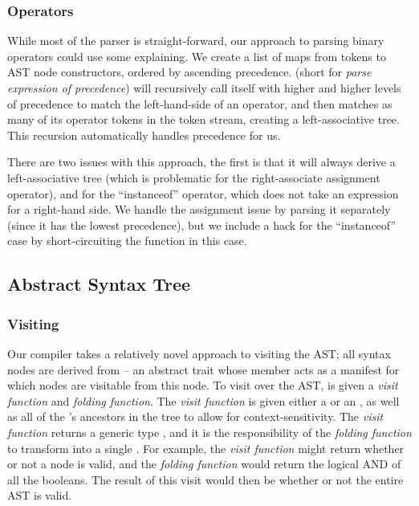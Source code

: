 \documentclass{article}
\begin{document}
\subsubsection{Operators}

While most of the parser is straight-forward, our approach to parsing binary operators could use some explaining. We
create a list of maps from tokens to AST node constructors, ordered by ascending precedence.  (short
for \emph{parse expression of precedence}) will recursively call itself with higher and higher levels of precedence to
match the left-hand-side of an operator, and then matches as many of its operator tokens in the token stream, creating a
left-associative tree. This recursion automatically handles precedence for us.

There are two issues with this approach, the first is that it will always derive a left-associative tree (which is
problematic for the right-associate assignment operator), and for the ``instanceof'' operator, which does not take an
expression for a right-hand side. We handle the assignment issue by parsing it separately (since it has the lowest
precedence), but we include a hack for the ``instanceof'' case by short-circuiting the function in this case.




\subsection{Abstract Syntax Tree}

\subsubsection{Visiting}
\label{sec:visiting}

Our compiler takes a relatively novel approach to visiting the AST; all syntax nodes are derived from 
-- an abstract trait whose \value{children} member acts as a manifest for which nodes are visitable from this node. To
visit over the AST,  is given a \textit{visit function} and \textit{folding function}. The \textit{visit
function} is given either a \value{Before(Node)} or an \value{After(Node)}, as well as all of the \value{Node}'s
ancestors in the tree to allow for context-sensitivity. The \textit{visit function} returns a generic type ,
and it is the responsibility of the \textit{folding function} to transform  into a single . For
example, the \textit{visit function} might return whether or not a node is valid, and the \textit{folding function}
would return the logical AND of all the booleans. The result of this visit would then be whether or not the entire AST
is valid.
\end{document}
